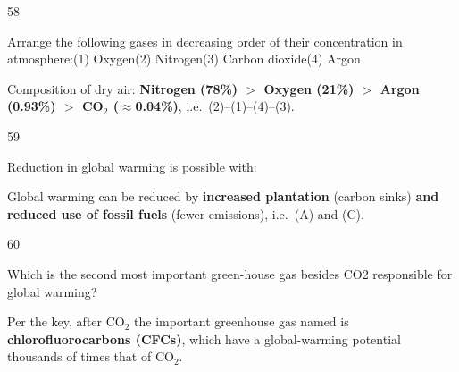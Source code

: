 \begin{question}{58}
{Arrange the following gases in decreasing order of their concentration in atmosphere:\newline (1) Oxygen\newline (2) Nitrogen\newline (3) Carbon dioxide\newline (4) Argon\par}
\begin{explain}
Composition of dry air: \textbf{Nitrogen (78\%) $>$ Oxygen (21\%) $>$ Argon (0.93\%) $>$ CO$_2$ ($\approx$0.04\%)}, i.e.\ (2)--(1)--(4)--(3).
\end{explain}
\end{question}

\begin{question}{59}
{Reduction in global warming is possible with:\par}
\begin{explain}
Global warming can be reduced by \textbf{increased plantation} (carbon sinks) \textbf{and reduced use of fossil fuels} (fewer emissions), i.e.\ (A) and (C).
\end{explain}
\end{question}

\begin{question}{60}
{Which is the second most important green-house gas besides CO2 responsible for global warming?\par}
\begin{explain}
Per the key, after CO$_2$ the important greenhouse gas named is \textbf{chlorofluorocarbons (CFCs)}, which have a global-warming potential thousands of times that of CO$_2$.
\end{explain}
\end{question}
